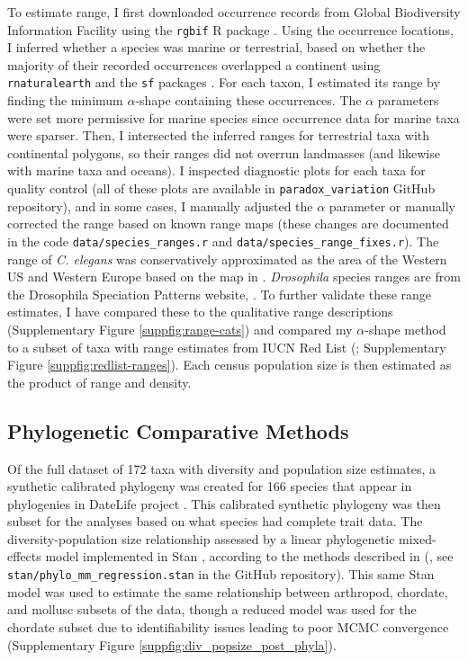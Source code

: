 \documentclass[11pt]{article}
\begin{document}
To estimate range, I first downloaded occurrence records from Global
Biodiversity Information Facility \parencite{noauthor_2020-ey} using the
\texttt{rgbif} R package \parencite{Chamberlain2014-up,Chamberlain2017-uz}.
Using the occurrence locations, I inferred whether a species was marine or
terrestrial, based on whether the majority of their recorded occurrences
overlapped a continent using \texttt{rnaturalearth} and the \texttt{sf}
packages \parencite{South2017-db,Pebesma2018-bs}. For each taxon, I estimated
its range by finding the minimum $\alpha$-shape containing these occurrences.
The $\alpha$ parameters were set more permissive for marine species since
occurrence data for marine taxa were sparser. Then, I intersected the inferred
ranges for terrestrial taxa with continental polygons, so their ranges did not
overrun landmasses (and likewise with marine taxa and oceans). I inspected
diagnostic plots for each taxa for quality control (all of these plots are
available in \texttt{paradox\_variation} GitHub repository), and in some cases,
I manually adjusted the $\alpha$ parameter or manually corrected the range
based on known range maps (these changes are documented in the code
\texttt{data/species\_ranges.r} and \texttt{data/species\_range\_fixes.r}).
The range of \emph{C. elegans} was conservatively approximated as the area of
the Western US and Western Europe based on the map in \textcite{Frezal2015-iw}.
\emph{Drosophila} species ranges are from the Drosophila Speciation Patterns
website, \parencite{Yukilevich2012-vn,Yukilevich2017-jg}. To further validate
these range estimates, I have compared these to the qualitative range
descriptions \textcite{Leffler2012-zj} (Supplementary Figure
\ref{suppfig:range-cats}) and compared my $\alpha$-shape method to a subset of
taxa with range estimates from IUCN Red List
(\cite{Chamberlain2020-tv,Iucn2020-ap}; Supplementary Figure
\ref{suppfig:redlist-ranges}). Each census population size
is then estimated as the product of range and density. 

\subsection*{Phylogenetic Comparative Methods}
\label{sec:methods-pcm}

Of the full dataset of 172 taxa with diversity and population size estimates, a
synthetic calibrated phylogeny was created for 166 species that appear in
phylogenies in DateLife project \parencite{OMeara2020-ds,Sanchez-Reyes2019-io}.
This calibrated synthetic phylogeny was then subset for the analyses based on
what species had complete trait data. The diversity-population size
relationship assessed by a linear phylogenetic mixed-effects model implemented
in Stan \parencite{Stan_Development_Team2020-ea}, according to the methods
described in (\cite{De_Villemereuil2014-kt}, see
\texttt{stan/phylo\_mm\_regression.stan} in the GitHub repository). This same
Stan model was used to estimate the same relationship between arthropod,
chordate, and mollusc subsets of the data, though a reduced model was used for
the chordate subset due to identifiability issues leading to poor MCMC
convergence (Supplementary Figure \ref{suppfig:div_popsize_post_phyla}). 
\end{document}
